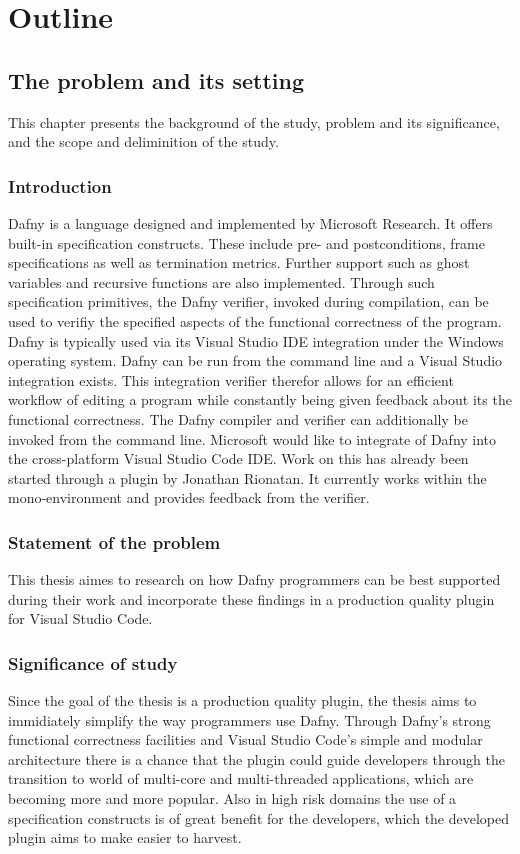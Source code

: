 \section{Outline}
\subsection{The problem and its setting}
This chapter presents the background of the study, problem and its significance, and the scope and deliminition of the study.
\subsubsection{Introduction}
Dafny is a language designed and implemented by Microsoft Research. It offers built-in specification constructs. These include pre- and postconditions, frame specifications as well as termination metrics. Further support such as ghost variables and recursive functions are also implemented. Through such specification primitives, the Dafny verifier, invoked during compilation, can be used to verifiy the specified aspects of the functional correctness of the program. \newline
Dafny is typically used via its Visual Studio IDE integration under the Windows operating system. Dafny can be run from the command line and a Visual Studio integration exists. This integration verifier therefor allows for an efficient workflow of editing a program while constantly being given feedback about its the functional correctness. The Dafny compiler and verifier can additionally be invoked from the command line. \newline
Microsoft would like to integrate of Dafny into the cross-platform Visual Studio Code IDE. Work on this has already been started through a plugin by Jonathan  Rionatan. It currently works within the mono-environment and provides feedback from the verifier. \newline

\subsubsection{Statement of the problem}
This thesis aimes to research on how Dafny programmers can be best supported during their work and incorporate these findings in a production quality plugin for Visual Studio Code. 
\subsubsection{Significance of study}
Since the goal of the thesis is a production quality plugin, the thesis aims to immidiately simplify the way programmers use Dafny. Through Dafny's strong functional correctness facilities and Visual Studio Code's simple and modular architecture there is a chance that the plugin could guide developers through the transition to world of multi-core and multi-threaded applications, which are becoming more and more popular. Also in high risk domains the use of a specification constructs is of great benefit for the developers, which the developed plugin aims to make easier to harvest.
